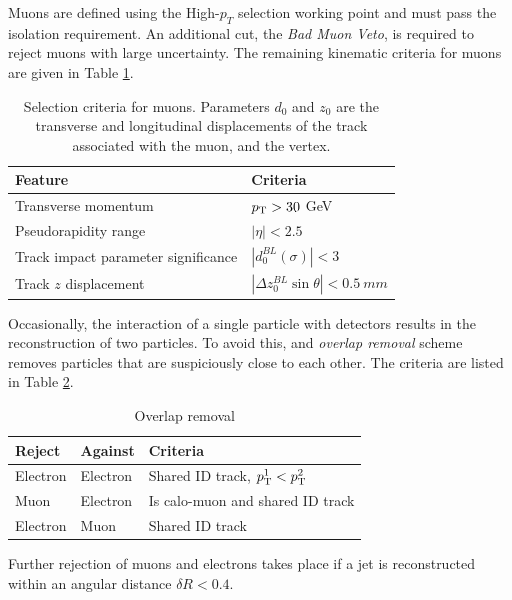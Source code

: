 Muons are defined using the High-$p_T$ selection working point and must pass the  isolation requirement.
An additional cut, the \emph{Bad Muon Veto}, is required to reject muons with large \pt uncertainty.
The remaining kinematic criteria for muons are given in Table \ref{tab:ciMuonsSel}.

\begin{table}[ht]
\caption{Selection criteria for muons. Parameters $d_{0}$ and $z_{0}$ are the transverse and longitudinal displacements of the track associated with the muon, and the vertex.}
\begin{center}
    \begin{tabular}[ht]{l l}
    \toprule
    Feature & Criteria \\
    \midrule
    Transverse momentum  & $p_\text{T}>30$ GeV\\
    Pseudorapidity range & $|\eta|<2.5$ \\
    Track impact parameter significance & $|d_{0}^{BL}(\sigma)|< 3$ \\
    Track $z$ displacement  & $|\Delta z_{0}^{BL} \sin{\theta}| < 0.5~mm$\\
    \bottomrule
    \end{tabular}
\end{center}
\label{tab:ciMuonsSel}
\end{table}

Occasionally, the interaction of a single particle with detectors results in the reconstruction of two particles.
To avoid this, and \emph{overlap removal} scheme removes particles that are suspiciously close to each other.
The criteria are listed in Table \ref{tab:ciOr}.
\begin{table}[ht]
\caption{Overlap removal}
\begin{center}
    \begin{tabular}[ht]{l l l}
    \toprule
    Reject & Against & Criteria \\
    \midrule
    Electron & Electron & Shared ID track, $p_\text{T}^1<p_\text{T}^2$ \\
    Muon     & Electron & Is calo-muon and shared ID track \\
    Electron & Muon     & Shared ID track \\
    \bottomrule
    \end{tabular}
\end{center}
\label{tab:ciOr}
\end{table}
Further rejection of muons and electrons takes place if a jet is reconstructed within an angular distance $\delta R<0.4$.


